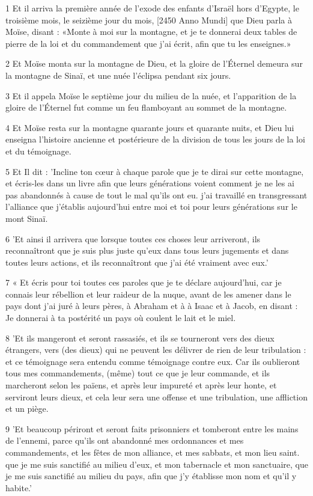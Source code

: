 \par 1 Et il arriva la première année de l'exode des enfants d'Israël hors d'Egypte, le troisième mois, le seizième jour du mois, [2450 Anno Mundi] que Dieu parla à Moïse, disant : «Monte à moi sur la montagne, et je te donnerai deux tables de pierre de la loi et du commandement que j'ai écrit, afin que tu les enseignes.»
\par 2 Et Moïse monta sur la montagne de Dieu, et la gloire de l'Éternel demeura sur la montagne de Sinaï, et une nuée l'éclipsa pendant six jours.
\par 3 Et il appela Moïse le septième jour du milieu de la nuée, et l'apparition de la gloire de l'Éternel fut comme un feu flamboyant au sommet de la montagne.
\par 4 Et Moïse resta sur la montagne quarante jours et quarante nuits, et Dieu lui enseigna l'histoire ancienne et postérieure de la division de tous les jours de la loi et du témoignage.
\par 5 Et Il dit : 'Incline ton cœur à chaque parole que je te dirai sur cette montagne, et écris-les dans un livre afin que leurs générations voient comment je ne les ai pas abandonnés à cause de tout le mal qu'ils ont eu. j'ai travaillé en transgressant l'alliance que j'établis aujourd'hui entre moi et toi pour leurs générations sur le mont Sinaï.
\par 6 'Et ainsi il arrivera que lorsque toutes ces choses leur arriveront, ils reconnaîtront que je suis plus juste qu'eux dans tous leurs jugements et dans toutes leurs actions, et ils reconnaîtront que j'ai été vraiment avec eux.'
\par 7 « Et écris pour toi toutes ces paroles que je te déclare aujourd'hui, car je connais leur rébellion et leur raideur de la nuque, avant de les amener dans le pays dont j'ai juré à leurs pères, à Abraham et à à Isaac et à Jacob, en disant : Je donnerai à ta postérité un pays où coulent le lait et le miel.
\par 8 'Et ils mangeront et seront rassasiés, et ils se tourneront vers des dieux étrangers, vers (des dieux) qui ne peuvent les délivrer de rien de leur tribulation : et ce témoignage sera entendu comme témoignage contre eux. Car ils oublieront tous mes commandements, (même) tout ce que je leur commande, et ils marcheront selon les païens, et après leur impureté et après leur honte, et serviront leurs dieux, et cela leur sera une offense et une tribulation, une affliction et un piège.
\par 9 'Et beaucoup périront et seront faits prisonniers et tomberont entre les mains de l'ennemi, parce qu'ils ont abandonné mes ordonnances et mes commandements, et les fêtes de mon alliance, et mes sabbats, et mon lieu saint. que je me suis sanctifié au milieu d'eux, et mon tabernacle et mon sanctuaire, que je me suis sanctifié au milieu du pays, afin que j'y établisse mon nom et qu'il y habite.'
